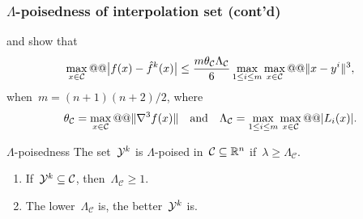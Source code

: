 \documentclass{polyu-presentation}
\newcommand{\iter}[1][]{x\ifthenelse{\equal{#1}{}}{}{^{#1}}}
\newcommand{\lagp}[1][]{L\ifthenelse{\equal{#1}{}}{}{_{#1}}}
\newcommand{\obj}{f}
\newcommand{\objm}[1][]{\hat{f}\ifthenelse{\equal{#1}{}}{}{^{#1}}}
\newcommand{\xpt}[1][]{\mathcal{Y}\ifthenelse{\equal{#1}{}}{}{^{#1}}}
\begin{document}
\begin{frame}
    \frametitle{$\Lambda$-poisedness of interpolation set (cont'd)}

    \textcite{Ciarlet_Raviart_1972} and \textcite{Powell_2001} show that
    \begin{equation*}
        \max_{\iter \in \mathcal{C}} @@ \abs[\big]{\obj(\iter) - \objm[k](\iter)} \le \frac{m \theta_{\mathcal{C}} \Lambda_{\mathcal{C}}}{6} \max_{1 \le i \le m} \max_{\iter \in \mathcal{C}} @@ \norm{\iter - y^i}^3,
    \end{equation*}
    when~$m = (n + 1)(n + 2) / 2$, where
    \begin{equation*}
        \theta_{\mathcal{C}} = \max_{\iter \in \mathcal{C}} @@ \norm{\nabla^3 \obj(\iter)} \quad \text{and} \quad \Lambda_{\mathcal{C}} = \max_{1 \le i \le m} \max_{\iter \in \mathcal{C}} @@ \abs{\lagp[i](\iter)}.
    \end{equation*}

    \begin{block}{$\Lambda$-poisedness \parencite{Conn_Scheinberg_Vicente_2009b}}
        The set~$\xpt[k]$ is \alert{$\Lambda$-poised} in~$\mathcal{C} \subseteq \mathbb{R}^n$ if~$\lambda \ge \Lambda_{\mathcal{C}}$.
    \end{block}
    
    \medskip

    \begin{block}{}
        \begin{enumerate}
            \item If~$\xpt[k] \subseteq \mathcal{C}$, then~$\Lambda_{\mathcal{C}} \ge 1$.
            \item The \alert{lower}~$\Lambda_{\mathcal{C}}$ is, the \alert{better}~$\xpt[k]$ is.
        \end{enumerate}
    \end{block}
\end{frame}
\end{document}
